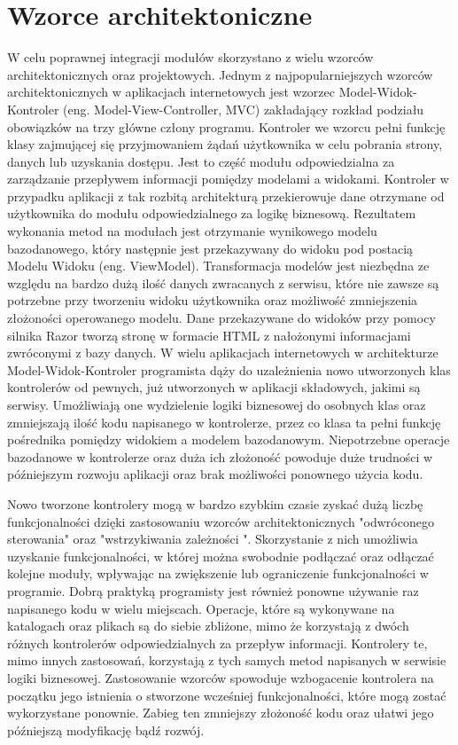 \section{Wzorce architektoniczne}
{W celu poprawnej integracji modułów skorzystano z wielu wzorców architektonicznych oraz projektowych. Jednym z najpopularniejszych wzorców architektonicznych w aplikacjach internetowych jest wzorzec Model-Widok-Kontroler (eng. Model-View-Controller, MVC) zakładający rozkład podziału obowiązków na trzy główne człony programu. Kontroler we wzorcu pełni funkcję klasy zajmującej się przyjmowaniem żądań użytkownika w celu pobrania strony, danych lub uzyskania dostępu. Jest to część modułu odpowiedzialna za zarządzanie przepływem informacji pomiędzy modelami a widokami. Kontroler w przypadku aplikacji z tak rozbitą architekturą przekierowuje dane otrzymane od użytkownika do modułu odpowiedzialnego za logikę biznesową. Rezultatem wykonania metod na modułach jest otrzymanie wynikowego modelu bazodanowego, który następnie jest przekazywany do widoku pod postacią Modelu Widoku (eng. ViewModel). Transformacja modelów jest niezbędna ze względu na bardzo dużą ilość danych zwracanych z serwisu, które nie zawsze są potrzebne przy tworzeniu widoku użytkownika oraz możliwość zmniejszenia złożoności operowanego modelu. Dane przekazywane do widoków przy pomocy silnika Razor tworzą stronę \mbox{w} formacie HTML z nałożonymi informacjami zwróconymi z bazy danych.
\newpage
W wielu aplikacjach internetowych w architekturze Model-Widok-Kontroler programista dąży do uzależnienia nowo utworzonych klas kontrolerów od pewnych, już utworzonych w aplikacji składowych, jakimi są serwisy. Umożliwiają one wydzielenie logiki biznesowej do osobnych klas oraz zmniejszają ilość kodu napisanego w kontrolerze, przez co klasa ta pełni funkcję pośrednika pomiędzy widokiem a modelem bazodanowym. Niepotrzebne operacje bazodanowe w kontrolerze oraz duża ich złożoność powoduje duże trudności w późniejszym rozwoju aplikacji oraz brak możliwości ponownego użycia kodu. 

Nowo tworzone kontrolery mogą w bardzo szybkim czasie zyskać dużą liczbę funkcjonalności dzięki zastosowaniu wzorców architektonicznych "odwróconego sterowania" oraz "wstrzykiwania zależności ". Skorzystanie z nich umożliwia uzyskanie funkcjonalności, w której można swobodnie podłączać oraz odłączać kolejne moduły, wpływając na zwiększenie lub ograniczenie funkcjonalności w programie. Dobrą praktyką programisty jest również ponowne używanie raz napisanego kodu w wielu miejscach. Operacje, które są wykonywane na katalogach oraz plikach są do siebie zbliżone, mimo że korzystają z dwóch różnych kontrolerów odpowiedzialnych za przepływ informacji. Kontrolery te, mimo innych zastosowań, korzystają z tych samych metod napisanych w serwisie logiki biznesowej. Zastosowanie wzorców spowoduje wzbogacenie kontrolera na początku jego istnienia o stworzone wcześniej funkcjonalności, które mogą zostać wykorzystane ponownie. Zabieg ten zmniejszy złożoność kodu oraz ułatwi jego późniejszą modyfikację bądź rozwój. 

}
